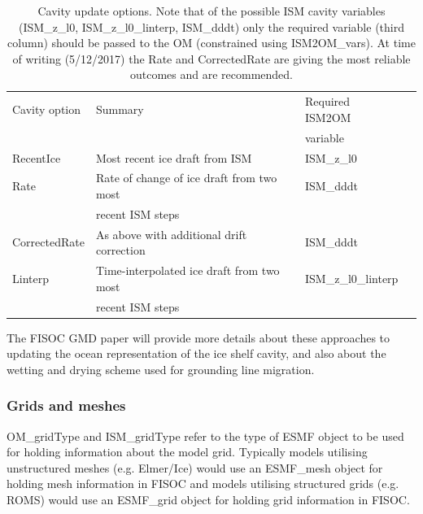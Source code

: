 \documentclass[11pt]{article}
\begin{document}
\begin{table}
  \begin{center}
    \begin{tabular}{ llll }
      Cavity option  & Summary                                    & Required ISM2OM \\
                     &                                            &  variable       \\
      \hline
      RecentIce      & Most recent ice draft from ISM             & ISM\_z\_l0      \\
      Rate           & Rate of change of ice draft from two most  & ISM\_dddt       \\
                     & recent ISM steps                           &                 \\
      CorrectedRate  & As above with additional drift correction  & ISM\_dddt       \\
      Linterp        & Time-interpolated ice draft from two most  & ISM\_z\_l0\_linterp \\
                     &  recent ISM steps                          &                  \\
    \end{tabular}
  \end{center}
  \caption{
    Cavity update options.  Note that of the possible ISM cavity variables 
    (ISM\_z\_l0, ISM\_z\_l0\_linterp, ISM\_dddt) only the required variable 
    (third column) should be passed to the OM (constrained using ISM2OM\_vars).
    At time of writing (5/12/2017) the Rate and CorrectedRate are giving 
    the most reliable outcomes and are recommended.
  }
  \label{tab:cavity}
\end{table}

The FISOC GMD paper will provide more  details about these approaches 
to updating the ocean 
representation of the ice shelf cavity, and also about the wetting and 
drying scheme used for grounding line migration.




\subsubsection{Grids and meshes}
OM\_gridType and ISM\_gridType refer to the type of ESMF object to be used for holding information about 
the model grid.  Typically models utilising unstructured meshes (e.g. Elmer/Ice) would use an 
ESMF\_mesh object for holding mesh information in FISOC and models utilising structured grids 
(e.g. ROMS) would use an ESMF\_grid object for holding grid information in FISOC.
\end{document}
